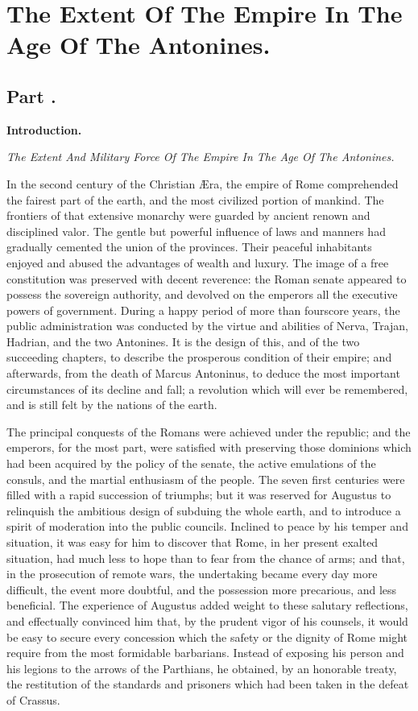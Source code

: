 \chapter{The Extent Of The Empire In The Age Of The Antonines.}
\section{Part \thesection.}
\begin{center}
\textbf{\large Introduction.}
\end{center}

\textit{The Extent And Military Force Of The Empire In The Age Of The Antonines.}
\vspace{\onelineskip}

In the second century of the Christian Æra, the empire of Rome
comprehended the fairest part of the earth, and the most
civilized portion of mankind. The frontiers of that extensive
monarchy were guarded by ancient renown and disciplined valor.
The gentle but powerful influence of laws and manners had
gradually cemented the union of the provinces. Their peaceful
inhabitants enjoyed and abused the advantages of wealth and
luxury. The image of a free constitution was preserved with
decent reverence: the Roman senate appeared to possess the
sovereign authority, and devolved on the emperors all the
executive powers of government. During a happy period of more
than fourscore years, the public administration was conducted by
the virtue and abilities of Nerva, Trajan, Hadrian, and the two
Antonines. It is the design of this, and of the two succeeding
chapters, to describe the prosperous condition of their empire;
and afterwards, from the death of Marcus Antoninus, to deduce the
most important circumstances of its decline and fall; a
revolution which will ever be remembered, and is still felt by
the nations of the earth.

The principal conquests of the Romans were achieved under the
republic; and the emperors, for the most part, were satisfied
with preserving those dominions which had been acquired by the
policy of the senate, the active emulations of the consuls, and
the martial enthusiasm of the people. The seven first centuries
were filled with a rapid succession of triumphs; but it was
reserved for Augustus to relinquish the ambitious design of
subduing the whole earth, and to introduce a spirit of moderation
into the public councils. Inclined to peace by his temper and
situation, it was easy for him to discover that Rome, in her
present exalted situation, had much less to hope than to fear
from the chance of arms; and that, in the prosecution of remote
wars, the undertaking became every day more difficult, the event
more doubtful, and the possession more precarious, and less
beneficial. The experience of Augustus added weight to these
salutary reflections, and effectually convinced him that, by the
prudent vigor of his counsels, it would be easy to secure every
concession which the safety or the dignity of Rome might require
from the most formidable barbarians. Instead of exposing his
person and his legions to the arrows of the Parthians, he
obtained, by an honorable treaty, the restitution of the
standards and prisoners which had been taken in the defeat of
Crassus.\footnotemark[1]

